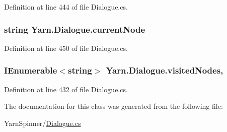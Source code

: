 Definition at line 444 of file Dialogue.\-cs.

\hypertarget{a00090_af368b5c342d585dc6953876c5965ccc8}{
\subsubsection[{current\-Node}]{\setlength{\rightskip}{0pt plus 5cm}string Yarn.\-Dialogue.\-current\-Node\hspace{0.3cm}{\ttfamily [get]}}}\label{a00090_af368b5c342d585dc6953876c5965ccc8}


Definition at line 450 of file Dialogue.\-cs.

\hypertarget{a00090_ac5661051e0b7f44527fe526c7766dbbf}{
\subsubsection[{visited\-Nodes}]{\setlength{\rightskip}{0pt plus 5cm}I\-Enumerable$<$string$>$ Yarn.\-Dialogue.\-visited\-Nodes\hspace{0.3cm}{\ttfamily [get]}, {\ttfamily [set]}}}\label{a00090_ac5661051e0b7f44527fe526c7766dbbf}


Definition at line 432 of file Dialogue.\-cs.



The documentation for this class was generated from the following file\-:\begin{DoxyCompactItemize}
\item 
Yarn\-Spinner/\hyperlink{a00285}{Dialogue.\-cs}\end{DoxyCompactItemize}
